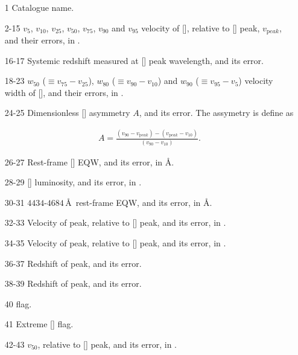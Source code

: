 \begin{itemize}
    
  \item[1] Catalogue name. 

  \item[2-15] $v_{5}$, $v_{10}$, $v_{25}$, $v_{50}$, $v_{75}$, $v_{90}$ and $v_{95}$ velocity of [], relative to [] peak, $v_{\mathrm peak}$, and their errors, in \kms.  

  \item[16-17] Systemic redshift measured at [] peak wavelength, and its error. 

  \item[18-23] $w_{50}$ ($\equiv v_{75} - v_{25}$), $w_{80}$ ($\equiv v_{90} - v_{10}$) and $w_{90}$ ($\equiv v_{95} - v_{5}$) velocity width of [], and their errors, in \kms.

  \item[24-25] Dimensionless [] asymmetry $A$, and its error. The assymetry is define as 

  \begingroup\makeatletter{}\check@mathfonts
   \begin{eqnarray}
    A = \frac{(v_{90} - v_{\mathrm peak}) - (v_{\mathrm peak} - v_{10})}{(v_{90} - v_{10})}.     
    \end{eqnarray}  
  \endgroup

  \item[26-27] Rest-frame [] EQW, and its error, in \AA.

  \item[28-29] [\ion{O}{III}] luminosity, and its error, in \ergs. 

  \item[30-31] $4434$-$4684$\,\AA\, rest-frame  EQW, and its error, in \AA.  

  \item[32-33] Velocity of \hb peak, relative to [] peak, and its error, in \kms. 

  \item[34-35] Velocity of \ha peak, relative to [] peak, and its error, in \kms. 

  \item[36-37] Redshift of \hb peak, and its error.

  \item[38-39] Redshift of \ha peak, and its error.

  \item[40]  flag. 

  \item[41] Extreme [] flag.   

  \item[42-43]  $v_{50}$, relative to [] peak, and its error, in \kms.

\end{itemize}


